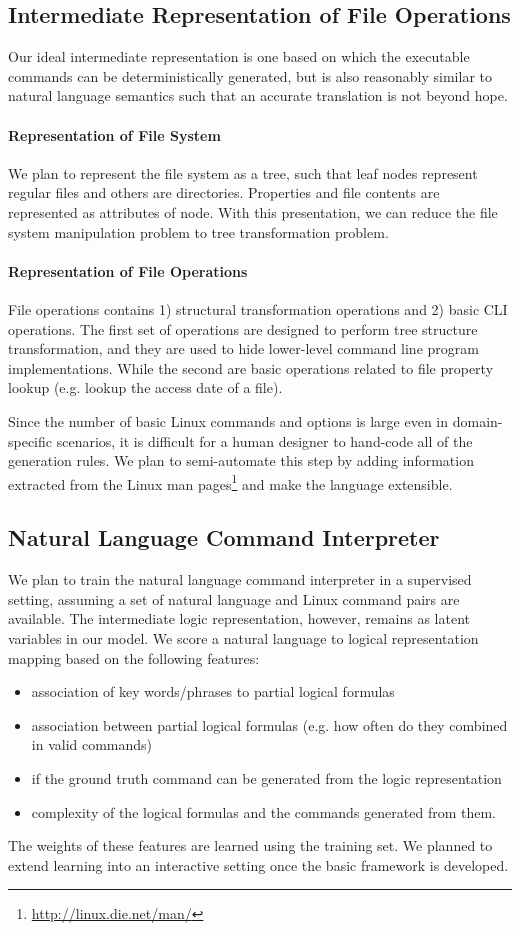 \subsection{Intermediate Representation of File Operations}
\label{subsec:represent}
Our ideal intermediate representation is one based on which the executable commands can be deterministically generated, but is also reasonably similar to natural language semantics such that an accurate translation is not beyond hope.
\paragraph{Representation of File System}
We plan to represent the file system as a tree, such that leaf nodes represent regular files and others are directories. Properties and file contents are represented as attributes of node. With this presentation, we can reduce the file system manipulation problem to tree transformation problem.
\paragraph{Representation of File Operations}
File operations contains 1) structural transformation operations and 2) basic CLI operations. The first set of operations are designed to perform tree structure transformation, and they are used to hide lower-level command line program implementations. While the second are basic operations related to file property lookup (e.g. lookup the access date of a file).

Since the number of basic Linux commands and options is large even in domain-specific scenarios, it is difficult for a human designer to hand-code all of the generation rules. We plan to semi-automate this step by adding information extracted from the Linux man pages\footnote{\url{http://linux.die.net/man/}} and make the language extensible.

\subsection{Natural Language Command Interpreter}
We plan to train the natural language command interpreter in a supervised setting, assuming a set of natural language and Linux command pairs are available. The intermediate logic representation, however, remains as latent variables in our model. We score a natural language to logical representation mapping based on the following features:
\begin{itemize}\itemsep-1pt
	\item association of key words/phrases to partial logical formulas
	\item association between partial logical formulas (e.g. how often do they combined in valid commands)
	\item if the ground truth command can be generated from the logic representation
	\item complexity of the logical formulas and the commands generated from them.
\end{itemize}
The weights of these features are learned using the training set. We planned to extend learning into an interactive setting once the basic framework is developed.